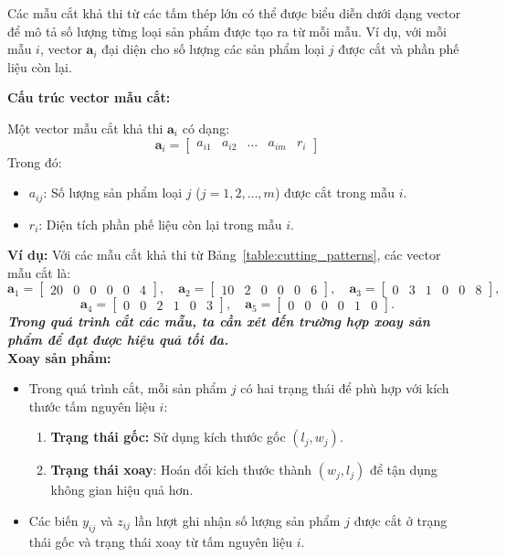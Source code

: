 \documentclass[a4paper]{article}
\begin{document}
Các mẫu cắt khả thi từ các tấm thép lớn có thể được biểu diễn dưới dạng vector để mô tả số lượng từng loại sản phẩm được tạo ra từ mỗi mẫu. Ví dụ, với mỗi mẫu \( i \), vector \( \mathbf{a}_i \) đại diện cho số lượng các sản phẩm loại \( j \) được cắt và phần phế liệu còn lại.

\textbf{Cấu trúc vector mẫu cắt:}

Một vector mẫu cắt khả thi \( \mathbf{a}_i \) có dạng:
\[
\mathbf{a}_i = \begin{bmatrix}
a_{i1} & a_{i2} & \dots & a_{im} & r_i
\end{bmatrix}
\]
Trong đó:
\begin{itemize}
    \item \( a_{ij} \): Số lượng sản phẩm loại \( j \) (\( j = 1, 2, \ldots, m \)) được cắt trong mẫu \( i \).
    \item \( r_i \): Diện tích phần phế liệu còn lại trong mẫu \( i \).
\end{itemize}

\textbf{Ví dụ:} Với các mẫu cắt khả thi từ Bảng~\ref{table:cutting_patterns}, các vector mẫu cắt là:
\[
\mathbf{a}_1 = \begin{bmatrix} 20 & 0 & 0 & 0 & 0 & 4 \end{bmatrix}, \quad
\mathbf{a}_2 = \begin{bmatrix} 10 & 2 & 0 & 0 & 0 & 6 \end{bmatrix}, \quad
\mathbf{a}_3 = \begin{bmatrix} 0 & 3 & 1 & 0 & 0 & 8 \end{bmatrix},
\]
\[
\mathbf{a}_4 = \begin{bmatrix} 0 & 0 & 2 & 1 & 0 & 3 \end{bmatrix}, \quad
\mathbf{a}_5 = \begin{bmatrix} 0 & 0 & 0 & 0 & 1 & 0 \end{bmatrix}.
\]
\textbf{\textit{Trong quá trình cắt các mẫu, ta cần xét đến trường hợp xoay sản phẩm để đạt được hiệu quả tối đa.}} \\

\hspace{11pt}
\textbf{Xoay sản phẩm:}
\begin{itemize}
    \item Trong quá trình cắt, mỗi sản phẩm \( j \) có hai trạng thái để phù hợp với kích thước tấm nguyên liệu \( i \):
    \begin{enumerate}
        \item \textbf{Trạng thái gốc:} Sử dụng kích thước gốc $(l_j, w_j)$.
        \item \textbf{Trạng thái xoay}: Hoán đổi kích thước thành $(w_j, l_j)$ để tận dụng không gian hiệu quả hơn.
    \end{enumerate}
    \item Các biến \( y_{ij} \) và \( z_{ij} \) lần lượt ghi nhận số lượng sản phẩm \( j \) được cắt ở trạng thái gốc và trạng thái xoay từ tấm nguyên liệu \( i \).
\end{itemize}
\end{document}
